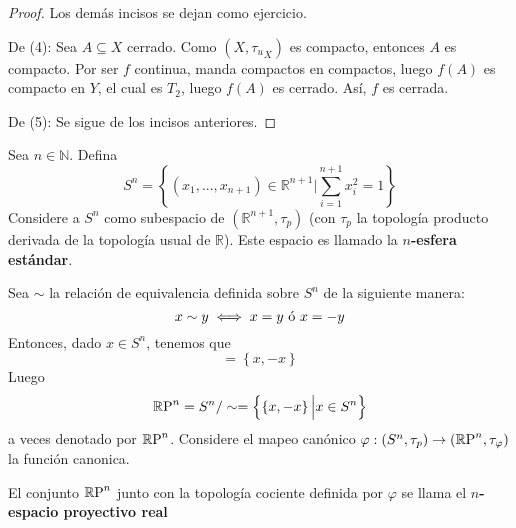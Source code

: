 \documentclass[12pt]{report}
\theoremstyle{largebreak}
\newcommand\cf[3]{\ensuremath{#1:#2\rightarrow#3}}
\begin{document}
    \begin{proof}
        Los demás incisos se dejan como ejercicio.

        De (4): Sea $A\subseteq X$ cerrado. Como $(X,{\tau_u}_X)$ es compacto, entonces $A$ es compacto. Por ser $f$ continua, manda compactos en compactos, luego $f(A)$ es compacto en $Y$, el cual es $T_2$, luego $f(A)$ es cerrado. Así, $f$ es cerrada.

        De (5): Se sigue de los incisos anteriores.
    \end{proof}

    \newcommand{\RP}{\ensuremath{\mathbb{R}\textup{P}}}

    \begin{exa}
        Sea $n\in\mathbb{N}$. Defina
        \begin{equation*}
            S^{n}=\left\{(x_1,...,x_{ n+1})\in\mathbb{R}^{ n+1}\Big|\sum_{ i=1}^{ n+1}x_i^2=1 \right\}
        \end{equation*}
        Considere a $S^n$ como subespacio de $(\mathbb{R}^{ n+1},\tau_p)$ (con $\tau_p$ la topología producto derivada de la topología usual de $\mathbb{R}$). Este espacio es llamado la \textbf{$n$-esfera estándar}.

        Sea $\sim$ la relación de equivalencia definida sobre $S^n$ de la siguiente manera:
        \begin{equation*}
            x\sim y\iff x=y\textup{ ó }x=-y
        \end{equation*}
        Entonces, dado $x\in S^n$, tenemos que
        \begin{equation*}
            [x]=\left\{x,-x\right\}
        \end{equation*}
        Luego
        \begin{equation*}
            \RP^n=S^n/\sim=\left\{\left\{x,-x\right\}\Big|x\in S^n \right\}
        \end{equation*}
        a veces denotado por $\RP^n$. Considere el mapeo canónico $\cf{\varphi}{(S^n,\tau_p)}{(\RP^n,\tau_\varphi)}$ la función canonica.

        El conjunto $\RP^n$ junto con la topología cociente definida por $\varphi$ se llama el \textbf{$n$-espacio proyectivo real}
    \end{exa}
    
\end{document}
